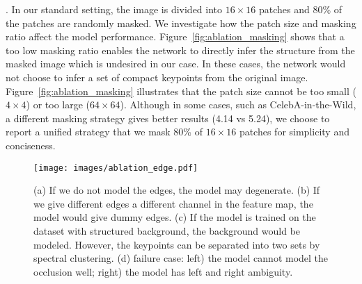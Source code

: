\documentclass{article}
\begin{document}
. 
In our standard setting, the image is divided into $16\times 16$ patches and 80\% of the patches are randomly masked. We investigate how the patch size and masking ratio affect the model performance. Figure~\ref{fig:ablation_masking} shows that a too low masking ratio enables the network to directly infer the structure from the masked image which is undesired in our case.
In these cases, the network would not choose to infer a set of compact keypoints from the original image. Figure~\ref{fig:ablation_masking} illustrates that the patch size cannot be too small ($4\times 4$) or too large ($64\times 64$). Although in some cases, such as CelebA-in-the-Wild, a different masking strategy gives better results (4.14 vs 5.24), we choose to report a unified strategy that we mask 80\% of $16\times16$ patches for simplicity and conciseness.

\begin{table}[t]
\centering
\caption{\textbf{Ablation tests on variants of edge heatmap generation}. The original design is proved to be the most robust one. Although in some cases it is not optimal, the difference is almost trivial.}
\label{tab:ablation_edge_gen}
\end{table}

\begin{figure}[t]
\begin{center}
  \texttt{[image: images/ablation\_edge.pdf]}
\end{center}
   \caption{(a) If we do not model the edges, the model may degenerate. (b) If we give different edges a different channel in the feature map, the model would give dummy edges. (c) If the model is trained on the dataset with structured background, the background would be modeled. However, the keypoints can be separated into two sets by spectral clustering. (d) failure case: left) the model cannot model the occlusion well; right) the model has left and right ambiguity.}
\label{fig:ablation_edge}
\end{figure}
\end{document}
